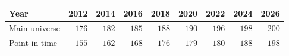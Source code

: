 \begin{tabular}{lrrrrrrrr}
\toprule
Year & 2012 & 2014 & 2016 & 2018 & 2020 & 2022 & 2024 & 2026 \\
\midrule
Main universe & $176$ & $182$ & $185$ & $188$ & $190$ & $196$ & $198$ & $200$ \\
Point-in-time & $155$ & $162$ & $168$ & $176$ & $179$ & $180$ & $188$ & $198$ \\
\bottomrule
\end{tabular}
